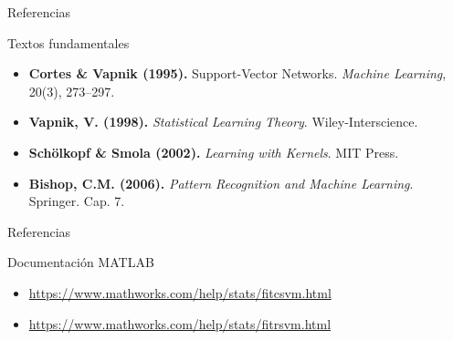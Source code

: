 \documentclass[aspectratio=169,xcolor=dvipsnames]{beamer}
\begin{document}
\begin{frame}{Referencias}
    \begin{exampleblock}{Textos fundamentales}
        \begin{itemize}
            \item \textbf{Cortes \& Vapnik (1995).} Support-Vector Networks. \textit{Machine Learning}, 20(3), 273--297.
            \item \textbf{Vapnik, V. (1998).} \textit{Statistical Learning Theory}. Wiley-Interscience.
            \item \textbf{Schölkopf \& Smola (2002).} \textit{Learning with Kernels}. MIT Press.
            \item \textbf{Bishop, C.M. (2006).} \textit{Pattern Recognition and Machine Learning}. Springer. Cap. 7.
        \end{itemize}
    \end{exampleblock}
\end{frame}
\begin{frame}{Referencias}

    \vspace{0.3em}
    \begin{exampleblock}{Documentación MATLAB}
        \begin{itemize}
            \item \url{https://www.mathworks.com/help/stats/fitcsvm.html}
            \item \url{https://www.mathworks.com/help/stats/fitrsvm.html}
        \end{itemize}
    \end{exampleblock}
\end{frame}
\end{document}
